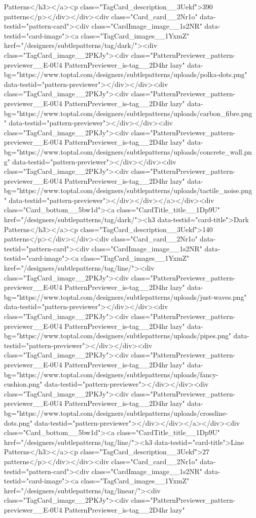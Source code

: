 Patterns</h3></a><p class="TagCard_description__3Uekf">390 patterns</p></div></div><div class="Card_card__2Nr1o" data-testid="pattern-card"><div class="CardImage_image__1s2NR" data-testid="card-image"><a class="TagCard_images__1YxmZ" href="/designers/subtlepatterns/tag/dark/"><div class="TagCard_image__2PKJy"><div class="PatternPreviewer_pattern-previewer__E-0U4 PatternPreviewer_is-tag__2D4hr lazy" data-bg="https://www.toptal.com/designers/subtlepatterns/uploads/polka-dots.png" data-testid="pattern-previewer"></div></div><div class="TagCard_image__2PKJy"><div class="PatternPreviewer_pattern-previewer__E-0U4 PatternPreviewer_is-tag__2D4hr lazy" data-bg="https://www.toptal.com/designers/subtlepatterns/uploads/carbon_fibre.png" data-testid="pattern-previewer"></div></div><div class="TagCard_image__2PKJy"><div class="PatternPreviewer_pattern-previewer__E-0U4 PatternPreviewer_is-tag__2D4hr lazy" data-bg="https://www.toptal.com/designers/subtlepatterns/uploads/concrete_wall.png" data-testid="pattern-previewer"></div></div><div class="TagCard_image__2PKJy"><div class="PatternPreviewer_pattern-previewer__E-0U4 PatternPreviewer_is-tag__2D4hr lazy" data-bg="https://www.toptal.com/designers/subtlepatterns/uploads/tactile_noise.png" data-testid="pattern-previewer"></div></div></a></div><div class="Card_bottom__5bw1d"><a class="CardTitle_title__1Dp9U" href="/designers/subtlepatterns/tag/dark/"><h3 data-testid="card-title">Dark Patterns</h3></a><p class="TagCard_description__3Uekf">140 patterns</p></div></div><div class="Card_card__2Nr1o" data-testid="pattern-card"><div class="CardImage_image__1s2NR" data-testid="card-image"><a class="TagCard_images__1YxmZ" href="/designers/subtlepatterns/tag/line/"><div class="TagCard_image__2PKJy"><div class="PatternPreviewer_pattern-previewer__E-0U4 PatternPreviewer_is-tag__2D4hr lazy" data-bg="https://www.toptal.com/designers/subtlepatterns/uploads/just-waves.png" data-testid="pattern-previewer"></div></div><div class="TagCard_image__2PKJy"><div class="PatternPreviewer_pattern-previewer__E-0U4 PatternPreviewer_is-tag__2D4hr lazy" data-bg="https://www.toptal.com/designers/subtlepatterns/uploads/pipes.png" data-testid="pattern-previewer"></div></div><div class="TagCard_image__2PKJy"><div class="PatternPreviewer_pattern-previewer__E-0U4 PatternPreviewer_is-tag__2D4hr lazy" data-bg="https://www.toptal.com/designers/subtlepatterns/uploads/fancy-cushion.png" data-testid="pattern-previewer"></div></div><div class="TagCard_image__2PKJy"><div class="PatternPreviewer_pattern-previewer__E-0U4 PatternPreviewer_is-tag__2D4hr lazy" data-bg="https://www.toptal.com/designers/subtlepatterns/uploads/crossline-dots.png" data-testid="pattern-previewer"></div></div></a></div><div class="Card_bottom__5bw1d"><a class="CardTitle_title__1Dp9U" href="/designers/subtlepatterns/tag/line/"><h3 data-testid="card-title">Line Patterns</h3></a><p class="TagCard_description__3Uekf">27 patterns</p></div></div><div class="Card_card__2Nr1o" data-testid="pattern-card"><div class="CardImage_image__1s2NR" data-testid="card-image"><a class="TagCard_images__1YxmZ" href="/designers/subtlepatterns/tag/linear/"><div class="TagCard_image__2PKJy"><div class="PatternPreviewer_pattern-previewer__E-0U4 PatternPreviewer_is-tag__2D4hr lazy" 
